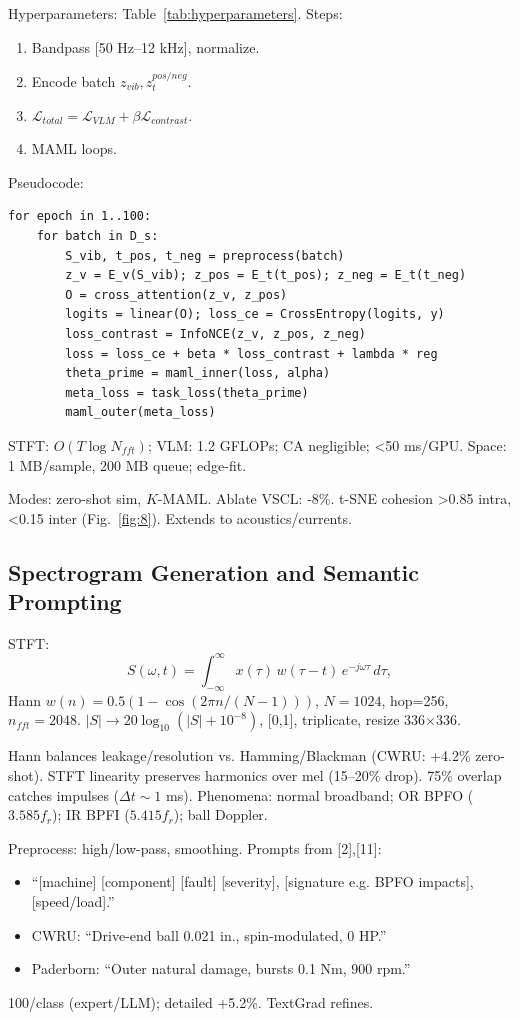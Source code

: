 \begin{table}[htbp]
Hyperparameters: Table~\ref{tab:hyperparameters}. Steps:
\begin{enumerate}
\item Bandpass [50 Hz--12 kHz], normalize.
\item Encode batch $z_{vib}, z_t^{pos/neg}$.
\item $\mathcal{L}_{total} = \mathcal{L}_{VLM} + \beta \mathcal{L}_{contrast}$.
\item MAML loops.
\end{enumerate}

Pseudocode:
\begin{verbatim}
for epoch in 1..100:
    for batch in D_s:
        S_vib, t_pos, t_neg = preprocess(batch)
        z_v = E_v(S_vib); z_pos = E_t(t_pos); z_neg = E_t(t_neg)
        O = cross_attention(z_v, z_pos)
        logits = linear(O); loss_ce = CrossEntropy(logits, y)
        loss_contrast = InfoNCE(z_v, z_pos, z_neg)
        loss = loss_ce + beta * loss_contrast + lambda * reg
        theta_prime = maml_inner(loss, alpha)
        meta_loss = task_loss(theta_prime)
        maml_outer(meta_loss)
\end{verbatim}

STFT: $O(T \log N_{fft})$; VLM: 1.2 GFLOPs; CA negligible; <50 ms/GPU. Space: 1 MB/sample, 200 MB queue; edge-fit.

Modes: zero-shot sim, $K$-MAML. Ablate VSCL: -8\%. t-SNE cohesion >0.85 intra, <0.15 inter (Fig.~\ref{fig:8}). Extends to acoustics/currents.

\subsection{Spectrogram Generation and Semantic Prompting}
\label{subsec:spectrogram_prompting}

STFT:
\begin{equation}
S(\omega, t) = \int_{-\infty}^{\infty} x(\tau) \, w(\tau - t) \, e^{-j \omega \tau} \, d\tau,
\label{eq:f2}
\end{equation}
Hann $w(n)=0.5(1-\cos(2\pi n/(N-1)))$, $N=1024$, hop=256, $n_{fft}=2048$. $|S| \to 20\log_{10}(|S|+10^{-8})$, [0,1], triplicate, resize 336$\times$336.

Hann balances leakage/resolution vs. Hamming/Blackman (CWRU: +4.2\% zero-shot). STFT linearity preserves harmonics over mel (15--20\% drop). 75\% overlap catches impulses ($\Delta t \sim1$ ms). Phenomena: normal broadband; OR BPFO ($3.585 f_r$); IR BPFI ($5.415 f_r$); ball Doppler.

Preprocess: high/low-pass, smoothing. Prompts from [2],[11]:
\begin{itemize}
\item ``[machine] [component] [fault] [severity], [signature e.g. BPFO impacts], [speed/load].''
\item CWRU: ``Drive-end ball 0.021 in., spin-modulated, 0 HP.''
\item Paderborn: ``Outer natural damage, bursts 0.1 Nm, 900 rpm.''
\end{itemize}
100/class (expert/LLM); detailed +5.2\%. TextGrad refines.


\end{table}
